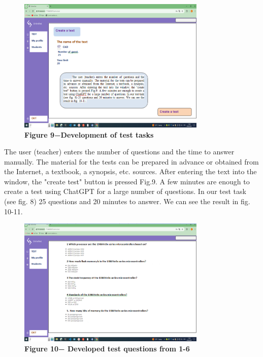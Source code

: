 \begin{figure}[H]
	\centering
	\includegraphics[width=0.8\textwidth]{assets/134}
	\caption*{\bfseries Figure 9−Development of test tasks}
\end{figure}


The user (teacher) enters the number of questions and the time to answer
manually. The material for the tests can be prepared in advance or
obtained from the Internet, a textbook, a synopsis, etc. sources. After
entering the text into the window, the "create test" button is pressed
Fig.9. A few minutes are enough to create a test using ChatGPT for a
large number of questions. In our test task (see fig. 8) 25 questions
and 20 minutes to answer. We can see the result in fig. 10-11.

\begin{figure}[H]
	\centering
	\includegraphics[width=0.8\textwidth]{assets/135}
	\caption*{\bfseries Figure 10− Developed test questions from 1-6}
\end{figure}



